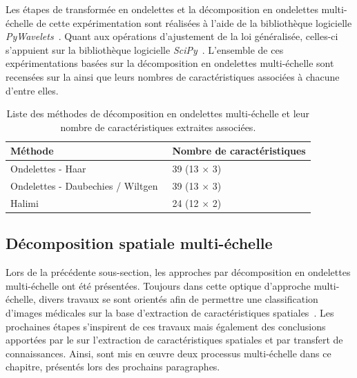 Les étapes de transformée en ondelettes et la décomposition en ondelettes multi-échelle de cette expérimentation sont réalisées à l'aide de la bibliothèque logicielle \textit{PyWavelets}~\cite{lee2006}. Quant aux opérations d'ajustement de la loi généralisée, celles-ci s'appuient sur la bibliothèque logicielle \textit{SciPy}~\cite{Virtanen2020}. L'ensemble de ces expérimentations basées sur la décomposition en ondelettes multi-échelle sont recensées sur la  ainsi que leurs nombres de caractéristiques associées à chacune d'entre elles.\par

\begin{table}[h]
    \centering
    \begin{tabular}{ll}
        \toprule
        \textbf{Méthode}                                    & \textbf{Nombre de caractéristiques}   \\ \hline
        Ondelettes - Haar                                   & 39 (13 $\times$ 3)                    \\ \hline
        Ondelettes - Daubechies / Wiltgen~\cite{Wiltgen2008}& 39 (13 $\times$ 3)                    \\ \hline
        Halimi~\cite{Halimi2017a}                           & 24 (12 $\times$ 2)                    \\
        \bottomrule
    \end{tabular}
    \caption{Liste des méthodes de décomposition en ondelettes multi-échelle et leur nombre de caractéristiques extraites associées.}
    \label{tab:wavelet_image_improvement_multiscale_nb_features}
\end{table}\par
\clearpage

\subsection{Décomposition spatiale multi-échelle}
Lors de la précédente sous-section, les approches par décomposition en ondelettes multi-échelle ont été présentées. Toujours dans cette optique d'approche multi-échelle, divers travaux se sont orientés afin de permettre une classification d'images médicales sur la base d'extraction de caractéristiques spatiales~\cite{Alsaih2016,Tzalavra2016}. Les prochaines étapes s'inspirent de ces travaux mais également des conclusions apportées par le  sur l'extraction de caractéristiques spatiales et par transfert de connaissances. Ainsi, sont mis en œuvre deux processus multi-échelle dans ce chapitre, présentés lors des prochains paragraphes.\par

